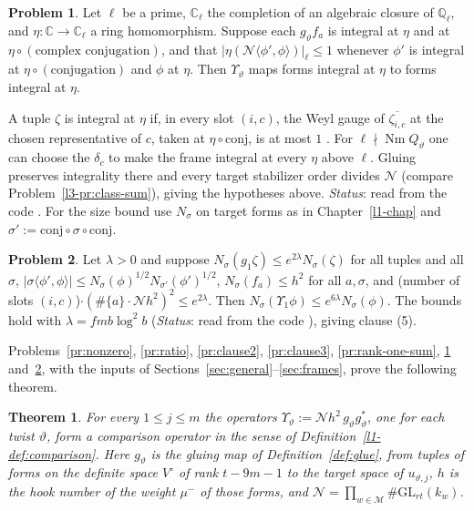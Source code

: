 \documentclass[reqno]{amsart}
\newcounter{chap}
\theoremstyle{definition}
\newtheorem{problem}{Problem}[section]
\theoremstyle{plain}
\newtheorem{theorem}{Theorem}[section]
\theoremstyle{remark}
\newcommand{\C}{{\mathbb{C}}}
\newcommand{\Mch}{{\mathcal{M}}}
\newcommand{\Nc}{{\mathcal{N}}}
\newcommand{\Nm}{\operatorname{Nm}}
\newcommand{\vt}{\vartheta}
\begin{document}
\begin{problem}\label{pr:clause4}
Let \(\ell\) be a prime, \(\C_\ell\) the completion of an algebraic closure of \(\mathbb Q_\ell\), and \(\eta\colon\C\to\C_\ell\) a ring homomorphism.  Suppose each \(g_\vt f_a\) is integral at \(\eta\) and at \(\eta\circ(\text{complex conjugation})\), and that \(\lvert\eta(\Nc\langle\phi',\phi\rangle)\rvert_\ell\le1\) whenever \(\phi'\) is integral at \(\eta\circ(\text{conjugation})\) and \(\phi\) at \(\eta\).  Then \(\Upsilon_\vt\) maps forms integral at \(\eta\) to forms integral at \(\eta\).
\end{problem}

A tuple \(\zeta\) is integral at \(\eta\) if, in every slot
\((i,c)\), the Weyl gauge of \(\overline{\zeta_{i,c}}\) at the chosen
representative of \(c\), taken at \(\eta\circ\mathrm{conj}\), is at
most \(1\) \cite[GluingMaps, line 82]{GL}.  For \(\ell\nmid\Nm Q_\vt\) one can choose the \(\delta_c\) to make the frame integral at every \(\eta\) above \(\ell\).  Gluing preserves integrality there and every target stabilizer order divides \(\Nc\) (compare Problem~\ref{l3-pr:class-sum}), giving the hypotheses above.  \emph{Status}: read from the code \cite[LiftVolumeHeight, lines 407--433, GluingMaps, line 552, LiftChains, line 548 and PAdicGauge, line 750]{GL}.  For the size bound use \(N_\sigma\) on target forms as in Chapter~\ref{l1-chap} and \(\sigma':=\mathrm{conj}\circ\sigma\circ\mathrm{conj}\).

\begin{problem}\label{pr:clause5}
Let \(\lambda>0\) and suppose \(N_\sigma(g_1\zeta)\le e^{2\lambda}N_\sigma(\zeta)\) for all tuples and all \(\sigma\), \(\lvert\sigma\langle\phi',\phi\rangle\rvert\le N_\sigma(\phi)^{1/2}N_{\sigma'}(\phi')^{1/2}\), \(N_\sigma(f_a)\le h^2\) for all \(a,\sigma\), and (number of slots \((i,c)\))\(\cdot(\#\{a\}\cdot\Nc h^2)^2\le e^{2\lambda}\).  Then \(N_\sigma(\Upsilon_1\phi)\le e^{6\lambda}N_\sigma(\phi)\).  The bounds hold with \(\lambda=fmb\log^2b\) (\emph{Status}: read from the code \cite[GluingMaps, line 755, PAdicGauge, line 673 and LiftVolumeHeight, line 443]{GL}), giving clause (5).
\end{problem}

Problems~\ref{pr:nonzero}, \ref{pr:ratio}, \ref{pr:clause2}, \ref{pr:clause3}, \ref{pr:rank-one-sum}, \ref{pr:clause4} and~\ref{pr:clause5}, with the inputs of Sections~\ref{sec:general}--\ref{sec:frames}, prove the following theorem.

\begin{theorem}\label{thm:operator}
For every \(1\le j\le m\) the operators \(\Upsilon_\vt := \Nc h^2\,g_\vt g_\vt^*\), one for each twist \(\vt\), form a comparison operator in the sense of Definition~\ref{l1-def:comparison}.  Here \(g_\vt\) is the gluing map of Definition~\ref{def:glue}, from tuples of forms on the definite space \(V^\circ\) of rank \(t-9m-1\) to the target space of \(u_{\vt,j}\), \(h\) is the hook number of the weight \(\mu^-\) of those forms, and \(\Nc = \prod_{w\in\Mch}\#\mathrm{GL}_{rt}(k_w)\).
\end{theorem}
\end{document}
